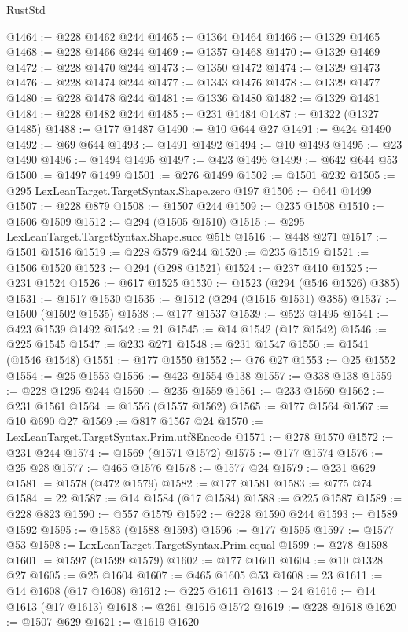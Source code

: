 \begin{lexlean}{RustStd}
\begin{coremodule}
@1464 := @228 @1462 @244
@1465 := @1364 @1464
@1466 := @1329 @1465
@1468 := @228 @1466 @244
@1469 := @1357 @1468
@1470 := @1329 @1469
@1472 := @228 @1470 @244
@1473 := @1350 @1472
@1474 := @1329 @1473
@1476 := @228 @1474 @244
@1477 := @1343 @1476
@1478 := @1329 @1477
@1480 := @228 @1478 @244
@1481 := @1336 @1480
@1482 := @1329 @1481
@1484 := @228 @1482 @244
@1485 := @231 @1484
@1487 := @1322 (@1327 @1485)
@1488 := @177 @1487
@1490 := @10 @644 @27
@1491 := @424 @1490
@1492 := @69 @644
@1493 := @1491 @1492
@1494 := @10 @1493
@1495 := @23 @1490
@1496 := @1494 @1495
@1497 := @423 @1496
@1499 := @642 @644 @53
@1500 := @1497 @1499
@1501 := @276 @1499
@1502 := @1501 @232
@1505 := @295 LexLeanTarget.TargetSyntax.Shape.zero @197
@1506 := @641 @1499
@1507 := @228 @879
@1508 := @1507 @244
@1509 := @235 @1508
@1510 := @1506 @1509
@1512 := @294 (@1505 @1510)
@1515 := @295 LexLeanTarget.TargetSyntax.Shape.succ @518
@1516 := @448 @271
@1517 := @1501 @1516
@1519 := @228 @579 @244
@1520 := @235 @1519
@1521 := @1506 @1520
@1523 := @294 (@298 @1521)
@1524 := @237 @410
@1525 := @231 @1524
@1526 := @617 @1525
@1530 := @1523 (@294 (@546 @1526) @385)
@1531 := @1517 @1530
@1535 := @1512 (@294 (@1515 @1531) @385)
@1537 := @1500 (@1502 @1535)
@1538 := @177 @1537
@1539 := @523 @1495
@1541 := @423 @1539 @1492
@1542 := 21
@1545 := @14 @1542 (@17 @1542)
@1546 := @225 @1545
@1547 := @233 @271
@1548 := @231 @1547
@1550 := @1541 (@1546 @1548)
@1551 := @177 @1550
@1552 := @76 @27
@1553 := @25 @1552
@1554 := @25 @1553
@1556 := @423 @1554 @138
@1557 := @338 @138
@1559 := @228 @1295 @244
@1560 := @235 @1559
@1561 := @233 @1560
@1562 := @231 @1561
@1564 := @1556 (@1557 @1562)
@1565 := @177 @1564
@1567 := @10 @690 @27
@1569 := @817 @1567 @24
@1570 := LexLeanTarget.TargetSyntax.Prim.utf8Encode
@1571 := @278 @1570
@1572 := @231 @244
@1574 := @1569 (@1571 @1572)
@1575 := @177 @1574
@1576 := @25 @28
@1577 := @465 @1576
@1578 := @1577 @24
@1579 := @231 @629
@1581 := @1578 (@472 @1579)
@1582 := @177 @1581
@1583 := @775 @74
@1584 := 22
@1587 := @14 @1584 (@17 @1584)
@1588 := @225 @1587
@1589 := @228 @823
@1590 := @557 @1579
@1592 := @228 @1590 @244
@1593 := @1589 @1592
@1595 := @1583 (@1588 @1593)
@1596 := @177 @1595
@1597 := @1577 @53
@1598 := LexLeanTarget.TargetSyntax.Prim.equal
@1599 := @278 @1598
@1601 := @1597 (@1599 @1579)
@1602 := @177 @1601
@1604 := @10 @1328 @27
@1605 := @25 @1604
@1607 := @465 @1605 @53
@1608 := 23
@1611 := @14 @1608 (@17 @1608)
@1612 := @225 @1611
@1613 := 24
@1616 := @14 @1613 (@17 @1613)
@1618 := @261 @1616 @1572
@1619 := @228 @1618
@1620 := @1507 @629
@1621 := @1619 @1620

\end{coremodule}
\end{lexlean}
